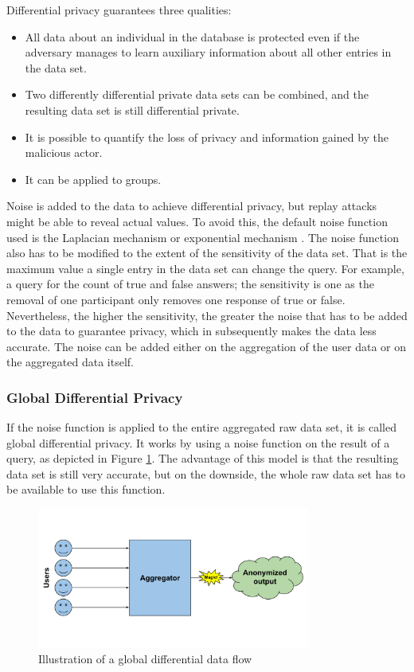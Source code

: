 Differential privacy guarantees three qualities:
\begin{itemize}
    \item All data about an individual in the database is protected even if the adversary manages to learn auxiliary information about all other entries in the data set.
    \item Two differently differential private data sets can be combined, and the resulting data set is still differential private.
    \item It is possible to quantify the loss of privacy and information gained by the malicious actor.
    \item It can be applied to groups.
\end{itemize}

Noise is added to the data to achieve differential privacy,  but replay attacks might be able to reveal actual values. To avoid this, the default noise function used is the Laplacian mechanism or exponential mechanism \cite{DBLP:journals/fttcs/DworkR14}. The noise function also has to be modified to the extent of the sensitivity of the data set. That is the maximum value a single entry in the data set can change the query. For example, a query for the count of true and false answers; the sensitivity is one as the removal of one participant only removes one response of true or false. Nevertheless, the higher the sensitivity, the greater the noise that has to be added to the data to guarantee privacy, which in subsequently makes the data less accurate. The noise can be added either on the aggregation of the user data or on the aggregated data itself.

\subsubsection{Global Differential Privacy}
If the noise function is applied to the entire aggregated raw data set, it is called global differential privacy. It works by using a noise function on the result of a query, as depicted in Figure \ref{fig:global_diff}. The advantage of this model is that the resulting data set is still very accurate, but on the downside, the whole raw data set has to be available to use this function.

\begin{figure}[htpb]
  \centering
  \includegraphics[width=0.8\textwidth]{figures/global_diff.png}
  \caption{Illustration of a global differential data flow\cite{desfontaines}}
  \label{fig:global_diff}
\end{figure}

